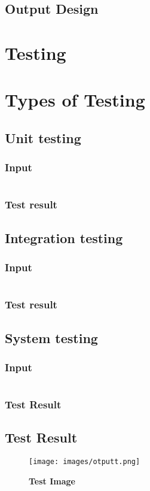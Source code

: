 \documentclass[10pt]{report}
\begin{document}
\subsection{Output Design}
\section{Testing}
\section{Types of Testing}
\subsection{Unit testing}
\subsubsection{Input}
\begin{lstlisting}
\end{lstlisting}
\subsubsection{Test result}
\subsection{Integration testing}
\subsubsection{Input}
\begin{lstlisting}
\end{lstlisting}
\subsubsection{Test result}
\subsection{System testing}
\subsubsection{Input}
\begin{lstlisting}
\end{lstlisting}
\subsubsection{Test Result}
\newpage
\subsection{Test Result}
\begin{figure}[H]
 \centering
 \texttt{[image: images/otputt.png]}
 \caption{\textbf{Test Image}}
\end{figure}
\end{document}
